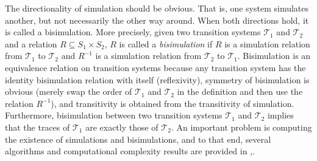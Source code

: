 \documentclass{amsart}
\theoremstyle{plain}
\theoremstyle{definition}
\theoremstyle{definition}
\begin{document}
The directionality of simulation should be obvious.  That is, one system
simulates another, but not necessarily the other way around.  When both
directions hold, it is called a bisimulation.  More precisely, given two
transition systems $\mathcal{T}_1$ and $\mathcal{T}_2$ and a relation $R\subseteq S_1 \times S_2$,
$R$ is called a \textit{bisimulation} if $R$ is a simulation relation from $\mathcal{T}_1$
to $\mathcal{T}_2$ and $R^{-1}$ is a simulation relation from $\mathcal{T}_2$ to $\mathcal{T}_1$.
Bisimulation is an equivalence relation on transition systems because any
transition system has the identity bisimulation relation with itself
(reflexivity), symmetry of bisimulation is obvious (merely swap the order of
$\mathcal{T}_1$ and $\mathcal{T}_2$ in the definition and then use the relation $R^{-1}$), and
transitivity is obtained from the transitivity of simulation.  Furthermore,
bisimulation between two transition systems $\mathcal{T}_1$ and $\mathcal{T}_2$ implies that the
traces of $\mathcal{T}_1$ are exactly those of $\mathcal{T}_2$.  An important problem is computing
the existence of simulations and bisimulations, and to that end, several
algorithms and computational complexity results are provided in
\cite{Baier2008},\cite{Tabuada2009}.
\end{document}
